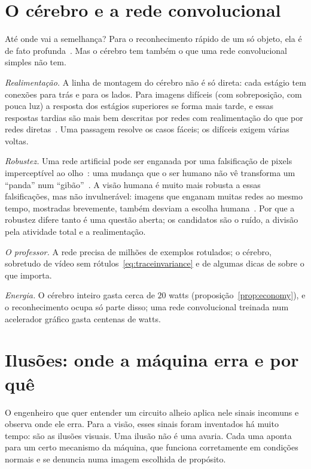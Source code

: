 \section{O cérebro e a rede convolucional}

Até onde vai a semelhança? Para o reconhecimento rápido de um só objeto, ela é de fato profunda~\cite{Yamins2014}. Mas o cérebro tem também o que uma rede convolucional simples não tem.

\emph{Realimentação.} A linha de montagem do cérebro não é só direta: cada estágio tem conexões para trás e para os lados. Para imagens difíceis (com sobreposição, com pouca luz) a resposta dos estágios superiores se forma mais tarde, e essas respostas tardias são mais bem descritas por redes com realimentação do que por redes diretas~\cite{Kar2019}. Uma passagem resolve os casos fáceis; os difíceis exigem várias voltas.

\emph{Robustez.} Uma rede artificial pode ser enganada por uma falsificação de pixels imperceptível ao olho~\cite{Szegedy2014}: uma mudança que o ser humano não vê transforma um ``panda'' num ``gibão''~\cite{Goodfellow2015}. A visão humana é muito mais robusta a essas falsificações, mas não invulnerável: imagens que enganam muitas redes ao mesmo tempo, mostradas brevemente, também desviam a escolha humana~\cite{Elsayed2018}. Por que a robustez difere tanto é uma questão aberta; os candidatos são o ruído, a divisão pela atividade total e a realimentação.

\emph{O professor.} A rede precisa de milhões de exemplos rotulados; o cérebro, sobretudo de vídeo sem rótulos~\eqref{eq:traceinvariance} e de algumas dicas de  sobre o que importa.

\emph{Energia.} O cérebro inteiro gasta cerca de $20$ watts (proposição~\ref{prop:economy}), e o reconhecimento ocupa só parte disso; uma rede convolucional treinada num acelerador gráfico gasta centenas de watts.

\section{Ilusões: onde a máquina erra e por quê}
\label{sec:illusions}

O engenheiro que quer entender um circuito alheio aplica nele sinais incomuns e observa onde ele erra. Para a visão, esses sinais foram inventados há muito tempo: são as ilusões visuais. Uma ilusão não é uma avaria. Cada uma aponta para um certo mecanismo da máquina, que funciona corretamente em condições normais e se denuncia numa imagem escolhida de propósito.

